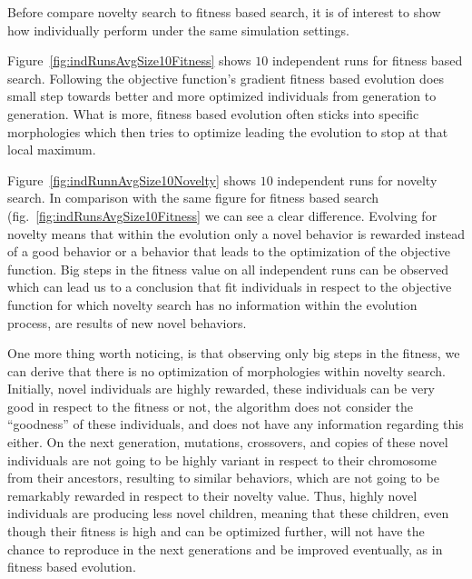 Before compare novelty search to fitness based search, it is of interest to show how individually perform under the same simulation settings.

Figure~\ref{fig:indRunsAvgSize10Fitness} shows $10$ independent runs for fitness based search. Following the objective function's gradient fitness based evolution does small step towards better and more optimized individuals from generation to generation. What is more, fitness based evolution often sticks into specific morphologies which then tries to optimize leading the evolution to stop at that local maximum.

Figure~\ref{fig:indRunnAvgSize10Novelty} shows $10$ independent runs for novelty  search. In comparison with the same figure for fitness based search (fig.~\ref{fig:indRunsAvgSize10Fitness} we can see a clear difference. Evolving for novelty means that within the evolution only a novel behavior is rewarded instead of a good behavior or a behavior that leads to the optimization of the objective function. Big steps in the fitness value on all independent runs can be observed which can lead us to a conclusion that fit individuals in respect to the objective function for which novelty search has no information within the evolution process, are results of new novel behaviors. 

One more thing worth noticing, is that observing only big steps in the fitness, we can derive that there is no optimization of morphologies within novelty search. Initially, novel individuals are highly rewarded, these individuals can be very good in respect to the fitness or not, the algorithm does not consider the ``goodness'' of these individuals, and does not have any information regarding this either. On the next generation, mutations, crossovers, and copies of these novel individuals are not going to be highly variant in respect to their chromosome from their ancestors, resulting to similar behaviors, which are  not going to be remarkably rewarded in respect to their novelty value. Thus, highly novel individuals are producing less novel children, meaning that these children, even though their fitness is high and can be optimized further, will not have the chance to reproduce in the next generations and be improved eventually, as in fitness based evolution.

